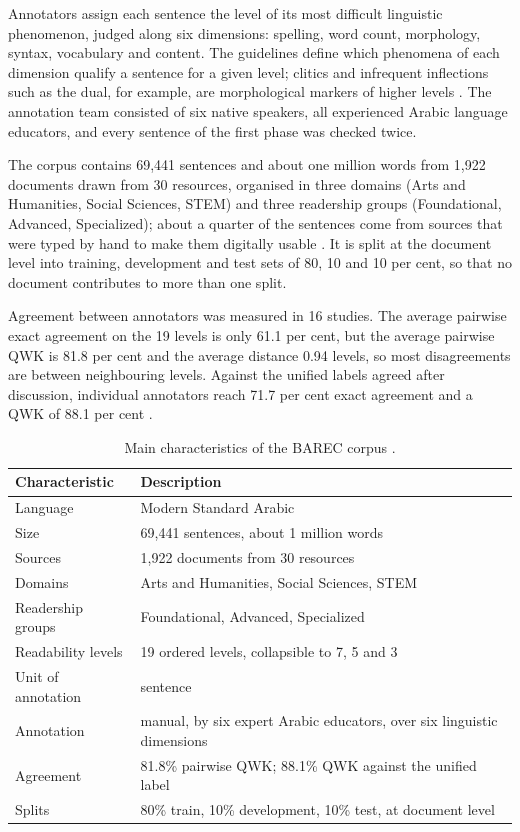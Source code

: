 Annotators assign each sentence the level of its most difficult linguistic phenomenon, judged
along six dimensions: spelling, word count, morphology, syntax, vocabulary and content. The
guidelines define which phenomena of each dimension qualify a sentence for a given level; clitics
and infrequent inflections such as the dual, for example, are morphological markers of higher
levels \cite{habash2025guidelines}. The annotation team consisted of six native speakers, all
experienced Arabic language educators, and every sentence of the first phase was checked twice.

The corpus contains 69{,}441 sentences and about one million words from 1{,}922 documents drawn
from 30 resources, organised in three domains (Arts and Humanities, Social Sciences, STEM) and
three readership groups (Foundational, Advanced, Specialized); about a quarter of the sentences
come from sources that were typed by hand to make them digitally usable \cite{elmadani2025barec}.
It is split at the document level into training, development and test sets of 80, 10 and 10 per
cent, so that no document contributes to more than one split.

Agreement between annotators was measured in 16 studies. The average pairwise exact agreement on
the 19 levels is only 61.1 per cent, but the average pairwise QWK is 81.8 per cent and the
average distance 0.94 levels, so most disagreements are between neighbouring levels. Against the
unified labels agreed after discussion, individual annotators reach 71.7 per cent exact agreement
and a QWK of 88.1 per cent \cite{elmadani2025barec}.

\begin{table}[H]
\centering
\caption{Main characteristics of the BAREC corpus \cite{elmadani2025barec}.}
\label{tab:barec_characteristics}
\begin{tabular}{p{4.2cm} p{7.4cm}}
\toprule
\textbf{Characteristic} & \textbf{Description} \\
\midrule
Language & Modern Standard Arabic \\
Size & 69{,}441 sentences, about 1 million words \\
Sources & 1{,}922 documents from 30 resources \\
Domains & Arts and Humanities, Social Sciences, STEM \\
Readership groups & Foundational, Advanced, Specialized \\
Readability levels & 19 ordered levels, collapsible to 7, 5 and 3 \\
Unit of annotation & sentence \\
Annotation & manual, by six expert Arabic educators, over six linguistic dimensions \\
Agreement & 81.8\% pairwise QWK; 88.1\% QWK against the unified label \\
Splits & 80\% train, 10\% development, 10\% test, at document level \\
\bottomrule
\end{tabular}
\end{table}

